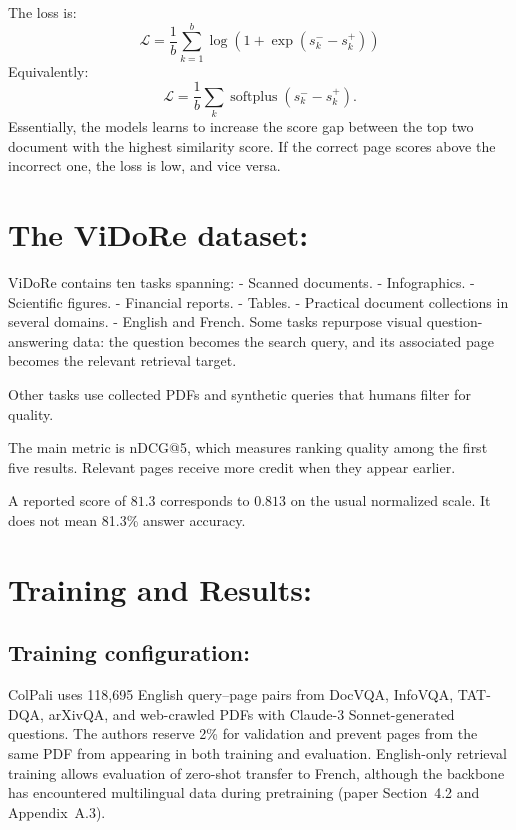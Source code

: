 \documentclass[11pt,a4paper]{article}
\begin{document}
The loss is:
\[
\boxed{
\mathcal{L}
=
\frac{1}{b}
\sum_{k=1}^{b}
\log\left(1+\exp(s_k^- - s_k^+)\right)
}
\]
Equivalently:
\[
\mathcal{L}
=
\frac{1}{b}
\sum_k
\operatorname{softplus}(s_k^- - s_k^+).
\]
Essentially, the models learns to increase the score gap between the top two document with the highest similarity score. If the correct page scores above the incorrect one, the loss is low, and vice versa.

\section{The ViDoRe dataset:}
ViDoRe contains ten tasks spanning:
- Scanned documents.
- Infographics.
- Scientific figures.
- Financial reports.
- Tables.
- Practical document collections in several domains.
- English and French.
Some tasks repurpose visual question-answering data: the question becomes the search query, and its associated page becomes the relevant retrieval target.

Other tasks use collected PDFs and synthetic queries that humans filter for quality.

The main metric is nDCG@5, which measures ranking quality among the first five results. Relevant pages receive more credit when they appear earlier.

A reported score of \(81.3\) corresponds to \(0.813\) on the usual normalized scale. It does not mean 81.3\% answer accuracy.

\section{Training and Results:}
\subsection{Training configuration:}

ColPali uses 118,695 English query--page pairs from DocVQA, InfoVQA, TAT-DQA, arXivQA, and web-crawled PDFs with Claude-3 Sonnet-generated questions. The authors reserve 2\% for validation and prevent pages from the same PDF from appearing in both training and evaluation. English-only retrieval training allows evaluation of zero-shot transfer to French, although the backbone has encountered multilingual data during pretraining (paper Section~4.2 and Appendix~A.3).
\end{document}
